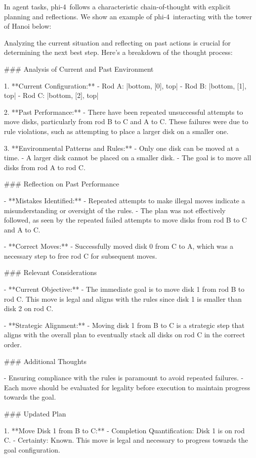 \documentclass[11pt]{article}
\newcommand{\modelwithoutspace}{\textsf{phi-4}}
\newcommand{\model}{\modelwithoutspace~}
\begin{document}
In agent tasks, \model follows a characteristic chain-of-thought with explicit planning and reflections. We show an example of \model interacting with the tower of Hanoi below:
\begin{HighlightVerbatim}
Analyzing the current situation and reflecting on past actions is crucial for determining the next best step. Here's a breakdown of the thought process:

### Analysis of Current and Past Environment

1. **Current Configuration:**
   - Rod A: |bottom, [0], top|
   - Rod B: |bottom, [1], top|
   - Rod C: |bottom, [2], top|

2. **Past Performance:**
   - There have been repeated unsuccessful attempts to move disks, particularly from rod B to C and A to C. These failures were due to rule violations, such as attempting to place a larger disk on a smaller one.

3. **Environmental Patterns and Rules:**
   - Only one disk can be moved at a time.
   - A larger disk cannot be placed on a smaller disk.
   - The goal is to move all disks from rod A to rod C.

### Reflection on Past Performance

- **Mistakes Identified:**
  - Repeated attempts to make illegal moves indicate a misunderstanding or oversight of the rules.
  - The plan was not effectively followed, as seen by the repeated failed attempts to move disks from rod B to C and A to C.

- **Correct Moves:**
  - Successfully moved disk 0 from C to A, which was a necessary step to free rod C for subsequent moves.

### Relevant Considerations

- **Current Objective:**
  - The immediate goal is to move disk 1 from rod B to rod C. This move is legal and aligns with the rules since disk 1 is smaller than disk 2 on rod C.

- **Strategic Alignment:**
  - Moving disk 1 from B to C is a strategic step that aligns with the overall plan to eventually stack all disks on rod C in the correct order.

### Additional Thoughts

- Ensuring compliance with the rules is paramount to avoid repeated failures.
- Each move should be evaluated for legality before execution to maintain progress towards the goal.

### Updated Plan

1. **Move Disk 1 from B to C:**
   - Completion Quantification: Disk 1 is on rod C.
   - Certainty: Known. This move is legal and necessary to progress towards the goal configuration.


\end{HighlightVerbatim}
\end{document}
